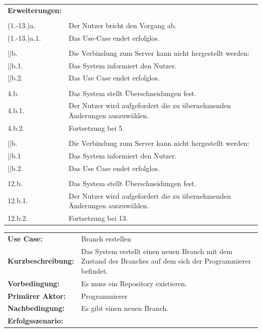 \documentclass[a4paper]{article}
\begin{document}
\begin{tabularx}{\textwidth}{lX}
\textbf{Erweiterungen:}\\\\
\qquad \qquad (1.-13.)a. & Der Nutzer bricht den Vorgang ab.\\
\qquad \qquad (1.-13.)a.1. & Das Use-Case endet erfolglos.\\
\\
\qquad \qquad 2||b. & Die Verbindung zum Server kann nicht hergestellt werden: \\
\qquad \qquad 2||b.1. & Das System informiert den Nutzer. \\
\qquad \qquad 2||b.2. & Das Use Case endet erfolglos. \\

\\
\qquad \qquad 4.b. & Das System stellt Überschneidungen fest.\\
\qquad \qquad 4.b.1. & Der Nutzer wird aufgefordert die zu übernehmenden Änderungen auszuwählen.\\
\qquad \qquad 4.b.2. & Fortsetzung bei 5.\\
\\
\qquad \qquad 11||b. & Die Verbindung zum Server kann nicht hergestellt werden: \\
\qquad \qquad 11||b.1 & Das System informiert den Nutzer. \\
\qquad \qquad 11||b.2. & Das Use Case endet erfolglos. \\
\\
\qquad \qquad 12.b. & Das System stellt Überschneidungen fest.\\
\qquad \qquad 12.b.1. & Der Nutzer wird aufgefordert die zu übernehmenden Änderungen auszuwählen.\\
\qquad \qquad 12.b.2. & Fortsetzung bei 13.\\
\end{tabularx}

\newpage

\begin{tabularx}{\textwidth}{lX}
\\
\textbf{Use Case:} & Branch erstellen\\
\textbf{Kurzbeschreibung:} & Das System erstellt einen neuen Branch mit dem Zustand des Branches auf dem sich der Programmierer befindet.\\
\textbf{Vorbedingung:} & Es muss ein Repository existieren.\\
\textbf{Primärer Aktor:} & Programmierer\\
\textbf{Nachbedingung:}	& Es gibt einen neuen Branch.\\
\textbf{Erfolgsszenario:} & 
\end{tabularx}
\end{document}
